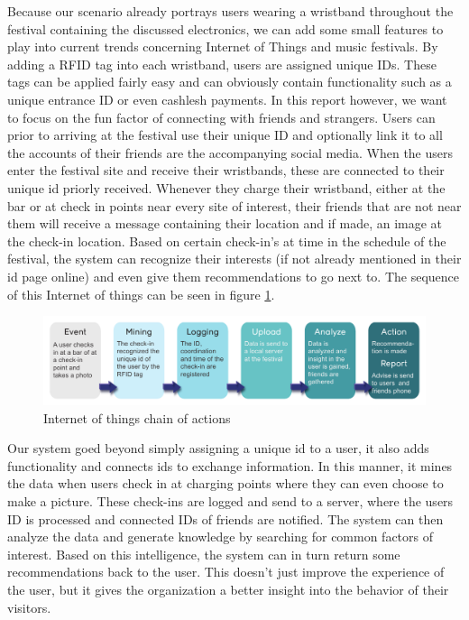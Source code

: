 Because our scenario already portrays users wearing a wristband throughout the festival containing the discussed electronics, we can add some small features to play into current trends concerning Internet of Things and music festivals.
By adding a RFID tag into each wristband, users are assigned unique IDs.
These tags can be applied fairly easy and can obviously contain functionality such as a unique entrance ID or even cashlesh payments.
In this report however, we want to focus on the fun factor of connecting with friends and strangers.
Users can prior to arriving at the festival use their unique ID and optionally link it to all the accounts of their friends are the accompanying social media.
When the users enter the festival site and receive their wristbands, these are connected to their unique id priorly received.
Whenever they charge their wristband, either at the bar or at check in points near every site of interest, their friends that are not near them will receive a message containing their location and if made, an image at the check-in location.
Based on certain check-in's at time in the schedule of the festival, the system can recognize their interests (if not already mentioned in their id page online) and even give them recommendations to go next to.
The sequence of this Internet of things can be seen in figure \ref{fig:iot}.

\begin{figure}[h!]
\centering
\includegraphics[width=1\textwidth]{IoT.pdf}
\caption{Internet of things chain of actions}
\label{fig:iot}
\end{figure}

Our system goed beyond simply assigning a unique id to a user, it also adds functionality and connects ids to exchange information. In this manner, it mines the data when users check in at charging points where they can even choose to make a picture.
These check-ins are logged and send to a server, where the users ID is processed and connected IDs of friends are notified.
The system can then analyze the data and generate knowledge by searching for common factors of interest.
Based on this intelligence, the system can in turn return some recommendations back to the user.
This doesn't just improve the experience of the user, but it gives the organization a better insight into the behavior of their visitors.









